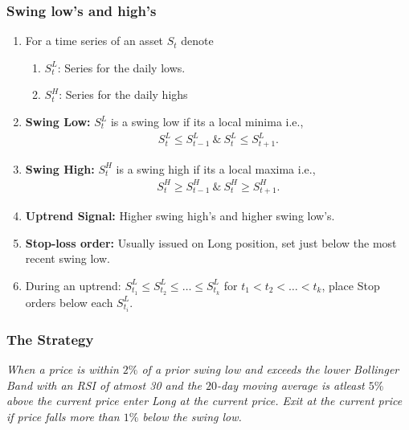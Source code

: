 \documentclass[slidestop,compress,mathserif,9pt]{beamer}
\def\b{\begin{center}}
\def\e{\end{center}}
\def\be{\begin{enumerate}}
\def\ee{\end{enumerate}}
\begin{document}
\begin{frame}

\frametitle{Swing low's and high's}

\be


\item
For a time series of an asset $S_t$ denote 
\be
\item $S_t^{L}$: Series for the daily lows.
\item $S_t^H$: Series for the daily highs
\ee


\item

\textbf{Swing Low:} $S_t^{L}$ is a swing low if its a local minima i.e., 
\begin{eqnarray*}
S_t^{L} \le S_{t-1}^{L} \ \& \ S_t^{L} \le S_{t+1}^{L}.
\end{eqnarray*}

\item

\textbf{Swing High:} $S_t^{H}$ is a swing high if its a local maxima i.e., 
\begin{eqnarray*}
S_t^{H} \ge S_{t-1}^{H} \ \& \ S_t^{H} \ge S_{t+1}^{H}.
\end{eqnarray*}
\item
\textbf{Uptrend Signal:} Higher swing high's and higher swing low's.
\item
\textbf{Stop-loss order:} Usually issued on Long position, set just below the most recent swing low.
\item
During an uptrend: $S_{t_1}^{L} \le S_{t_2}^{L} \le \ldots \le S_{t_k}^L$ for $t_1 < t_2 < \ldots < t_k$, place Stop orders below each $S_{t_i}^L$.

\ee
\end{frame}


\begin{frame}

\frametitle{The Strategy}

\vspace{0.5in}

\b
\emph{When a price is within $2\%$ of a prior swing low and exceeds the lower Bollinger Band with an RSI of atmost 30 and the $20$-day moving average is atleast $5\%$ above the current price enter Long at the current price. Exit at the current price if price falls more than $1\%$ below the swing low.}
\e



\end{frame}
\end{document}
